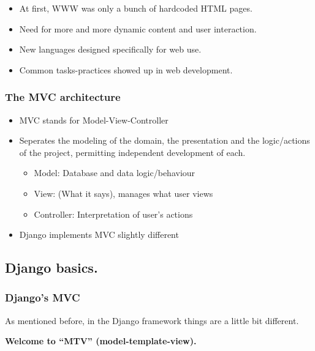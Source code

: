 \documentclass{beamer}
\begin{document}
\begin{frame}
\begin{itemize}[<+->]
  \item At first, WWW was only a bunch of hardcoded HTML pages.
  \item Need for more and more dynamic content and user interaction.
  \item New languages designed specifically for web use.
  \item Common tasks-practices showed up in web development.
\end{itemize}

\end{frame}

\begin{frame}
  \frametitle{The MVC architecture}
\begin{itemize}[<+->]
  \item MVC stands for Model-View-Controller
  \item Seperates the modeling of the domain, the presentation and the logic/actions of the project, permitting independent development of each.
    \begin{itemize}
      \item Model: Database and data logic/behaviour
      \item View: (What it says), manages what user views
      \item Controller: Interpretation of user's actions
    \end{itemize}
  \item Django implements MVC slightly different
\end{itemize}
\end{frame}

\subsection{Django basics.}
\begin{frame}
  \frametitle{Django's MVC}
As mentioned before, in the Django framework things are a little bit different. 
\begin{center}
\textbf{Welcome to ``MTV'' (model-template-view).}
\end{center}
\end{frame}
\end{document}
